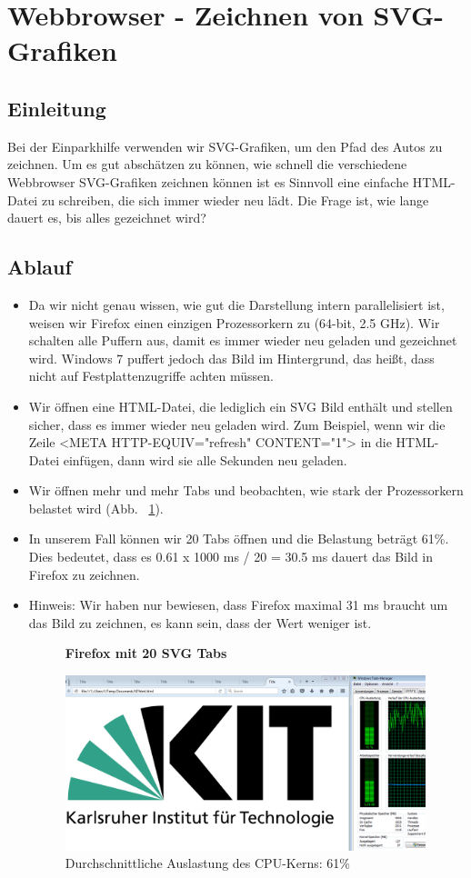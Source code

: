 \documentclass[qualitaetssicherung.tex]{subfiles}
\begin{document}
\section{Webbrowser - Zeichnen von SVG-Grafiken}
	\subsection{Einleitung}
	Bei der Einparkhilfe verwenden wir SVG-Grafiken, um den Pfad des Autos zu zeichnen. Um es gut abschätzen zu können, wie schnell die verschiedene Webbrowser SVG-Grafiken zeichnen können ist es Sinnvoll eine einfache HTML-Datei zu schreiben, die sich immer wieder neu lädt. Die Frage ist, wie lange dauert es, bis alles gezeichnet wird?
	\subsection{Ablauf}
	\begin{itemize}
	\item Da wir nicht genau wissen, wie gut die Darstellung intern parallelisiert ist, weisen wir Firefox einen einzigen Prozessorkern zu (64-bit, 2.5 GHz). Wir schalten alle Puffern aus, damit es immer wieder neu geladen und gezeichnet wird. Windows 7 puffert jedoch das Bild im Hintergrund, das heißt, dass nicht auf Festplattenzugriffe achten müssen.
	\item Wir öffnen eine HTML-Datei, die lediglich ein SVG Bild enthält und stellen sicher, dass es immer wieder neu geladen wird. Zum Beispiel, wenn wir die Zeile <META HTTP-EQUIV="refresh" CONTENT="1"> in die HTML-Datei einfügen, dann wird sie alle Sekunden neu geladen.
	\item Wir öffnen mehr und mehr Tabs und beobachten, wie stark der Prozessorkern belastet wird (Abb. ~\ref{firefox_svg}).
	\item In unserem Fall können wir 20 Tabs öffnen und die Belastung beträgt 61\%. Dies bedeutet, dass es 0.61 x 1000 ms / 20 = 30.5 ms dauert das Bild in Firefox zu zeichnen.
	\item Hinweis: Wir haben nur bewiesen, dass Firefox maximal 31 ms braucht um das Bild zu zeichnen, es kann sein, dass der Wert weniger ist.
	
	\begin{figure}[H]
    \textbf{Firefox mit 20 SVG Tabs}\par\medskip
    \includegraphics[width=0.99\textwidth]{Images/firefox-svg.png}
    \caption{Durchschnittliche Auslastung des CPU-Kerns: 61\%}
		\label{firefox_svg}
	\end{figure}
	\end{itemize}
	
\end{document}
